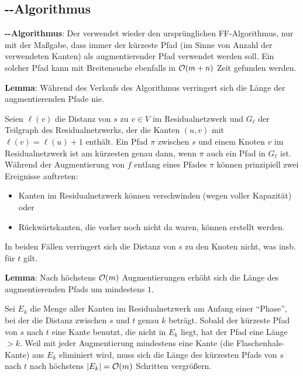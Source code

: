 \subsection{%
    --Algorithmus%
}

\textbf{--Algorithmus}:
Der  verwendet
wieder den ursprünglichen FF-Algorithmus, nur mit der Maßgabe, dass
immer der kürzeste Pfad (im Sinne von Anzahl der verwendeten Kanten) als augmentierender Pfad
verwendet werden soll.
Ein solcher Pfad kann mit Breitensuche ebenfalls in $\mathcal{O}(m + n)$ Zeit gefunden werden.

\linie

\textbf{Lemma}:
Während des Verlaufs des Algorithmus verringert sich die Länge der augmentierenden Pfade nie.

\begin{Beweis}
    Seien $\ell(v)$ die Distanz von $s$ zu $v \in V$ im Residualnetzwerk und
    $G_\ell$ der Teilgraph des Residualnetzwerks, der die Kanten $(u, v)$ mit
    $\ell(v) = \ell(u) + 1$ enthält.
    Ein Pfad $\pi$ zwischen $s$ und einem Knoten $v$ im Residualnetzwerk ist am kürzesten
    genau dann, wenn $\pi$ auch ein Pfad in $G_\ell$ ist.
    Während der Augmentierung von $f$ entlang eines Pfades $\pi$ können prinzipiell zwei Ereignisse
    auftreten:
    \begin{itemize}
        \item
        Kanten im Residualnetzwerk können verschwinden (wegen voller Kapazität) oder

        \item
        Rückwärtskanten, die vorher noch nicht da waren, können erstellt werden.
    \end{itemize}
    In beiden Fällen verringert sich die Distanz von $s$ zu den Knoten nicht,
    was insb. für $t$ gilt.
\end{Beweis}

\textbf{Lemma}:
Nach höchstens $\mathcal{O}(m)$ Augmentierungen erhöht sich die Länge des augmentierenden Pfads um
mindestens $1$.

\begin{Beweis}
    Sei $E_k$ die Menge aller Kanten im Residualnetzwerk am Anfang einer "`Phase"', bei der
    die Distanz zwischen $s$ und $t$ genau $k$ beträgt.
    Sobald der kürzeste Pfad von $s$ nach $t$ eine Kante benutzt, die nicht in $E_k$ liegt,
    hat der Pfad eine Länge $> k$.
    Weil mit jeder Augmentierung mindestens eine Kante (die Flaschenhals-Kante) aus $E_k$
    eliminiert wird, muss sich die Länge des kürzesten Pfads von $s$ nach $t$ nach höchstens
    $|E_k| = \mathcal{O}(m)$ Schritten vergrößern.
\end{Beweis}

